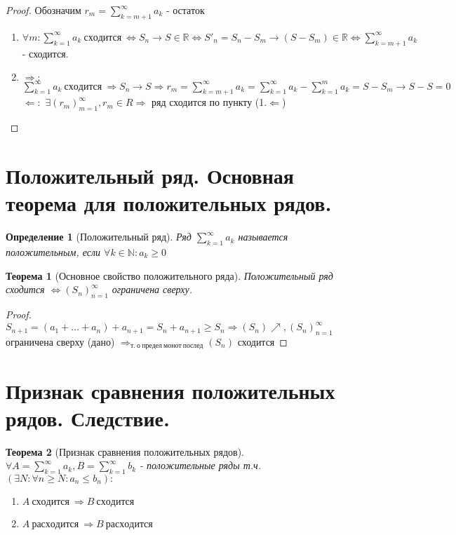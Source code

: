 \documentclass[12pt, a4]{article}
\newtheorem*{theorem}{Теорема}
\newtheorem*{definition}{Определение}
\renewcommand{\implies}{\Rightarrow}
\newcommand{\bimplies}{\Leftarrow}
\renewcommand{\iff}{\Leftrightarrow}
\newcommand{\R}{\mathbb{R}}
\newcommand{\N}{\mathbb{N}}
\begin{document}
\begin{proof}
Обозначим $r_m = \sum_{k=m+1}^\infty a_k$ - остаток
\begin{enumerate}
    \item $\forall m: \sum_{k=1}^\infty a_k\ сходится\ \iff S_n \to S \in \R \iff S'_n = S_n - S_m \to (S - S_m) \in \R \iff \sum_{k=m+1}^\infty a_k$ - сходится.
    \item $\implies:$ $\sum_{k=1}^\infty a_k\ сходится\ \implies S_n \to S \implies r_m = \sum_{k=m+1}^\infty a_k = \sum_{k=1}^\infty a_k - \sum_{k=1}^m a_k = S - S_m \to S - S = 0$\\
    $\bimplies:$ $\exists (r_m)_{m=1}^\infty, r_m \in R \implies$ ряд сходится по пункту (1.$\bimplies$)
\end{enumerate}
\end{proof}

\section{Положительный ряд. Основная теорема для положительных рядов.}

\begin{definition}[Положительный ряд]
Ряд $\sum_{k=1}^\infty a_k$ называется положительным, если $\forall k \in \N: a_k \geq 0$
\end{definition}

\begin{theorem}[Основное свойство положительного ряда] 
Положительный ряд сходится $\iff (S_n)_{n=1}^\infty$ ограничена сверху.
\end{theorem}

\begin{proof}
$S_{n+1} = (a_1 + ... + a_n) + a_{n+1} = S_n + a_{n+1} \geq S_n \implies (S_n)\nearrow, (S_n)_{n=1}^\infty$ ограничена сверху (дано) $\implies_{т.\ о\ предел\ монот\ послед} (S_n)$ сходится
\end{proof}

\section{Признак сравнения положительных рядов. Следствие.}

\begin{theorem}[Признак сравнения положительных рядов]
$\forall A = \sum_{k=1}^\infty a_k, B = \sum_{k=1}^\infty b_k$ - положительные ряды т.ч. $(\exists N: \forall n \geq N: a_n \leq b_n):$\\
\begin{enumerate}
    \item $A\ сходится\ \implies B\ сходится$
    \item $A\ расходится\ \implies B\ расходится$
\end{enumerate}
\end{theorem}
\end{document}
